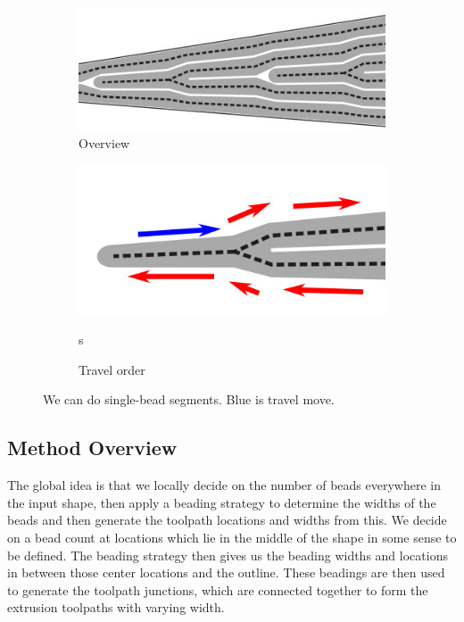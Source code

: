 \begin{figure}
\begin{subfigure}{0.45\columnwidth}
\includegraphics[width=\columnwidth]{sources/method/single_bead_strategy.jpg}
\caption{Overview}
\label{single_bead_strategy_overview}
\end{subfigure}
\begin{subfigure}{0.45\columnwidth}
\includegraphics[width=\columnwidth]{sources/method/single_bead_strategy_order.jpg}
\caption{Travel order}s
\end{subfigure}
\caption{We can do single-bead segments. Blue is travel move.}
\label{single_bead_strategy}
\end{figure}

\subsection{Method Overview}
The global idea is that we locally decide on the number of beads everywhere in the input shape, then apply a beading strategy to determine the widths of the beads and then generate the toolpath locations and widths from this.
We decide on a bead count at locations which lie in the middle of the shape in some sense to be defined.
The beading strategy then gives us the beading widths and locations in between those center locations and the outline.
These beadings are then used to generate the toolpath junctions, which are connected together to form the extrusion toolpaths with varying width.

